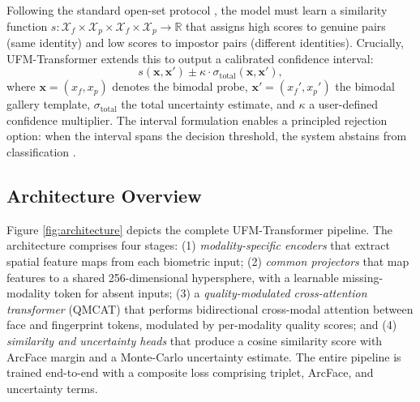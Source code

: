 \documentclass[10pt,journal,compsoc]{IEEEtran}
\begin{document}
Following the standard open-set protocol \cite{nandakumar2008likelihood}, the model must learn a similarity function $s: \mathcal{X}_f \times \mathcal{X}_p \times \mathcal{X}_f \times \mathcal{X}_p \rightarrow \mathbb{R}$ that assigns high scores to genuine pairs (same identity) and low scores to impostor pairs (different identities). Crucially, UFM-Transformer extends this to output a calibrated confidence interval:
\begin{equation}
\label{eq:verification_objective}
s(\mathbf{x}, \mathbf{x}') \pm \kappa \cdot \sigma_{\text{total}}(\mathbf{x}, \mathbf{x}'),
\end{equation}
where $\mathbf{x} = (x_f, x_p)$ denotes the bimodal probe, $\mathbf{x}' = (x_f', x_p')$ the bimodal gallery template, $\sigma_{\text{total}}$ the total uncertainty estimate, and $\kappa$ a user-defined confidence multiplier. The interval formulation enables a principled rejection option: when the interval spans the decision threshold, the system abstains from classification \cite{balomenos2018automatic}.

\subsection{Architecture Overview}
\label{sec:architecture_overview}

Figure \ref{fig:architecture} depicts the complete UFM-Transformer pipeline. The architecture comprises four stages: (1) \textit{modality-specific encoders} that extract spatial feature maps from each biometric input; (2) \textit{common projectors} that map features to a shared 256-dimensional hypersphere, with a learnable missing-modality token for absent inputs; (3) a \textit{quality-modulated cross-attention transformer} (QMCAT) that performs bidirectional cross-modal attention between face and fingerprint tokens, modulated by per-modality quality scores; and (4) \textit{similarity and uncertainty heads} that produce a cosine similarity score with ArcFace margin and a Monte-Carlo uncertainty estimate. The entire pipeline is trained end-to-end with a composite loss comprising triplet, ArcFace, and uncertainty terms.
\end{document}
